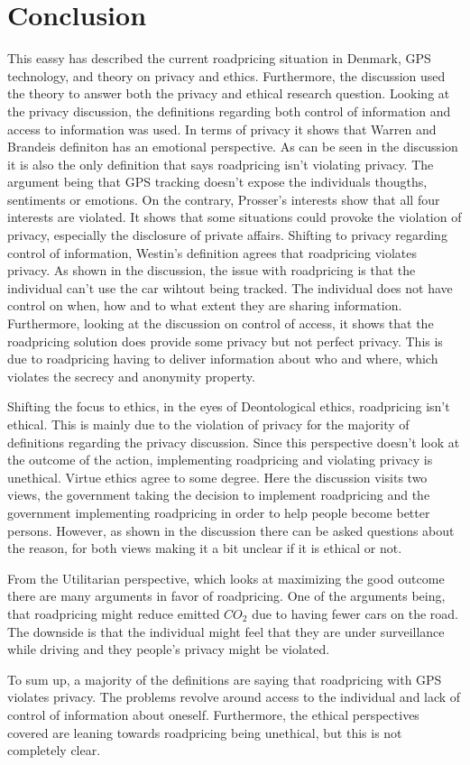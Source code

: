 \section{Conclusion}
This eassy has described the current roadpricing situation in Denmark, GPS technology, and theory on privacy and ethics. Furthermore, the discussion used the theory to answer both the privacy and ethical research question. Looking at the privacy discussion, the definitions regarding both control of information and access to information was used. In terms of privacy it shows that Warren and Brandeis definiton has an emotional perspective. As can be seen in the discussion it is also the only definition that says roadpricing isn't violating privacy. 
The argument being that GPS tracking doesn't expose the individuals thougths, sentiments or emotions. On the contrary, Prosser's interests show that all four interests are violated. It shows that some situations could provoke the violation of privacy, especially the disclosure of private affairs. Shifting to privacy regarding control of information, Westin's definition agrees that roadpricing violates privacy. As shown in the discussion, the issue with roadpricing is that the individual can't use the car wihtout being tracked. The individual does not have control on when, how and to what extent they are sharing information. Furthermore, looking at the discussion on control of access, it shows that the roadpricing solution does provide some privacy but not perfect privacy. This is due to roadpricing having to deliver information about who and where, which violates the secrecy and anonymity property. 

Shifting the focus to ethics, in the eyes of Deontological ethics, roadpricing isn't ethical. This is mainly due to the violation of privacy for the majority of definitions regarding the privacy discussion. Since this perspective doesn't look at the outcome of the action, implementing roadpricing and violating privacy is unethical. Virtue ethics agree to some degree. Here the discussion visits two views, the government taking the decision to implement roadpricing and the government implementing roadpricing in order to help people become better persons. However, as shown in the discussion there can be asked questions about the reason, for both views making it a bit unclear if it is ethical or not.

From the Utilitarian perspective, which looks at maximizing the good outcome there are many arguments in favor of roadpricing. One of the arguments being, that roadpricing might reduce emitted $CO_2$ due to having fewer cars on the road. The downside is that the individual might feel that they are under surveillance while driving and they people's privacy might be violated. 

To sum up, a majority of the definitions are saying that roadpricing with GPS violates privacy. The problems revolve around access to the individual and lack of control of information about oneself. Furthermore, the ethical perspectives covered are leaning towards roadpricing being unethical, but this is not completely clear.